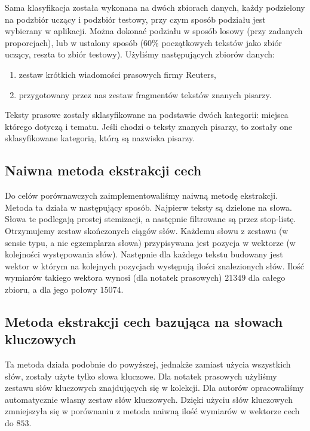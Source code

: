\documentclass[a4paper]{classrep}
\begin{document}
Sama klasyfikacja została wykonana na dwóch zbiorach danych, każdy podzielony na podzbiór uczący i podzbiór testowy, przy czym sposób podziału jest wybierany w aplikacji.
Można dokonać podziału w sposób losowy (przy zadanych proporcjach), lub w ustalony sposób (60\% początkowych tekstów jako zbiór uczący, reszta to zbiór testowy).
Użyliśmy następujących zbiorów danych:
\begin{enumerate}
\item zestaw krótkich wiadomości prasowych firmy Reuters,
\item przygotowany przez nas zestaw fragmentów tekstów znanych pisarzy.
\end{enumerate}
Teksty prasowe zostały sklasyfikowane na podstawie dwóch kategorii: miejsca którego dotyczą i tematu.
Jeśli chodzi o teksty znanych pisarzy, to zostały one sklasyfikowane kategorią, którą są nazwiska pisarzy.
\subsection{Naiwna metoda ekstrakcji cech}
\label{sec:naiwna}
Do celów porównawczych zaimplementowaliśmy naiwną metodę ekstrakcji. Metoda ta działa w następujący sposób. Najpierw teksty są dzielone na słowa. Słowa te podlegają prostej stemizacji,
a następnie filtrowane są przez stop-listę. Otrzymujemy zestaw skończonych ciągów słów. Każdemu słowu z zestawu (w sensie typu, a nie egzemplarza słowa) przypisywana jest pozycja
w wektorze (w kolejności występowania słów). Następnie dla każdego tekstu budowany jest wektor w którym na kolejnych pozycjach występują ilości znalezionych słów. Ilość wymiarów takiego wektora
wynosi (dla notatek prasowych) \(21349\) dla całego zbioru, a dla jego połowy \(15074\).
\subsection{Metoda ekstrakcji cech bazująca na słowach kluczowych}
\label{sec:kluczowe}
Ta metoda działa podobnie do powyższej, jednakże zamiast użycia wszystkich słów, zostały użyte tylko słowa kluczowe. Dla notatek prasowych użyliśmy zestawu słów kluczowych znajdujących się w kolekcji. Dla autorów opracowaliśmy automatycznie własny zestaw słów kluczowych. Dzięki użyciu słów kluczowych zmniejszyła się w porównaniu z metoda naiwną ilość wymiarów w wektorze cech do \(853\).
\end{document}
